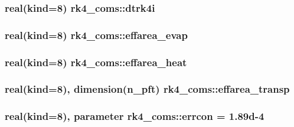 \subsubsection[{\texorpdfstring{dtrk4i}{dtrk4i}}]{\setlength{\rightskip}{0pt plus 5cm}real(kind=8) rk4\+\_\+coms\+::dtrk4i}\hypertarget{namespacerk4__coms_a987c7ccf90cfcf40c2a925b2c1057404}{}\label{namespacerk4__coms_a987c7ccf90cfcf40c2a925b2c1057404}
\subsubsection[{\texorpdfstring{effarea\+\_\+evap}{effarea_evap}}]{\setlength{\rightskip}{0pt plus 5cm}real(kind=8) rk4\+\_\+coms\+::effarea\+\_\+evap}\hypertarget{namespacerk4__coms_aae531dd6ba4cf10a03c3fad2b61071bb}{}\label{namespacerk4__coms_aae531dd6ba4cf10a03c3fad2b61071bb}
\subsubsection[{\texorpdfstring{effarea\+\_\+heat}{effarea_heat}}]{\setlength{\rightskip}{0pt plus 5cm}real(kind=8) rk4\+\_\+coms\+::effarea\+\_\+heat}\hypertarget{namespacerk4__coms_af575cfc8fb0e2063e1d3a08be26aea3a}{}\label{namespacerk4__coms_af575cfc8fb0e2063e1d3a08be26aea3a}
\subsubsection[{\texorpdfstring{effarea\+\_\+transp}{effarea_transp}}]{\setlength{\rightskip}{0pt plus 5cm}real(kind=8), dimension(n\+\_\+pft) rk4\+\_\+coms\+::effarea\+\_\+transp}\hypertarget{namespacerk4__coms_aa9b9a7fcec09aad8a6d3423c30c3b1de}{}\label{namespacerk4__coms_aa9b9a7fcec09aad8a6d3423c30c3b1de}
\subsubsection[{\texorpdfstring{errcon}{errcon}}]{\setlength{\rightskip}{0pt plus 5cm}real(kind=8), parameter rk4\+\_\+coms\+::errcon = 1.\+89d-\/4}\hypertarget{namespacerk4__coms_a5b9d4d10eb75a3f0b44f3876ade2c3eb}{}\label{namespacerk4__coms_a5b9d4d10eb75a3f0b44f3876ade2c3eb}
